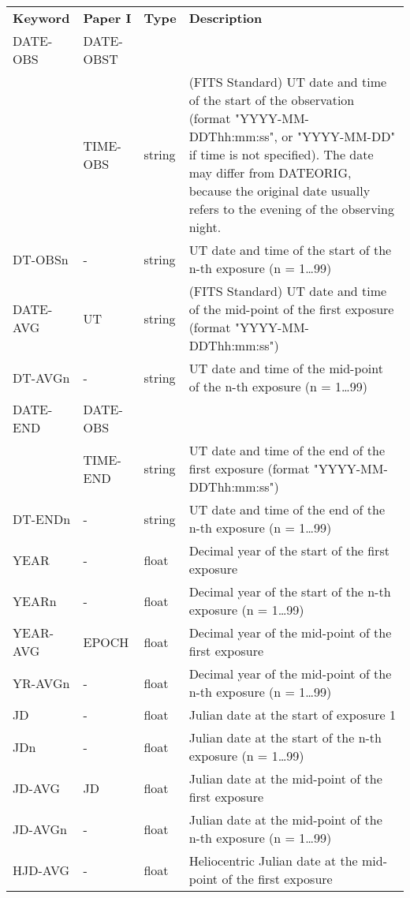 \documentclass[11pt]{ivoa}
\begin{document}
\begingroup
\footnotesize
\begin{longtable}{lllp{}}
\sptablerule
\textbf{Keyword}&\textbf{Paper I}&\textbf{Type}&\textbf{Description}\\
\sptablerule
DATE-OBS  &DATE-OBST &\\
          &TIME-OBS  &string     &(FITS Standard) UT date and time of the
          start of the observation (format "YYYY-MM-DDThh:mm:ss", or
          "YYYY-MM-DD" if time is not specified). The date may differ
          from DATEORIG, because the original date usually refers to the
          evening of the observing night.\\
DT-OBSn   &-         &string     &UT date and time of the start of the
n-th exposure (n = 1…99)\\
DATE-AVG  &UT        &string     &(FITS Standard) UT date and time of the
mid-point of the first exposure (format "YYYY-MM-DDThh:mm:ss")\\
DT-AVGn   &-         &string     &UT date and time of the mid-point of
the n-th exposure (n = 1…99)\\
DATE-END  &DATE-OBS  &\\
          &TIME-END  &string     &UT date and time of the end of the
          first exposure (format "YYYY-MM-DDThh:mm:ss")\\
DT-ENDn   &-         &string     &UT date and time of the end of the n-th
exposure (n = 1…99)\\
YEAR      &-         &float     &Decimal year of the start of the first
exposure\\
YEARn     &-         &float     &Decimal year of the start of the n-th
exposure (n = 1…99)\\
YEAR-AVG  &EPOCH     &float     &Decimal year of the mid-point of the
first exposure\\
YR-AVGn   &-         &float     &Decimal year of the mid-point of the
n-th exposure (n = 1…99)\\
JD        &-         &float     &Julian date at the start of exposure 1\\
JDn       &-         &float     &Julian date at the start of the n-th
exposure (n = 1…99)\\
JD-AVG    &JD        &float     &Julian date at the mid-point of the
first exposure\\
JD-AVGn   &-         &float     &Julian date at the mid-point of the n-th
exposure (n = 1…99)\\
HJD-AVG   &-         &float     &Heliocentric Julian date at the
mid-point of the first exposure\\

\end{longtable}
\end{document}
